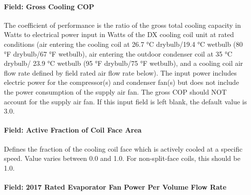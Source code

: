 \paragraph{Field: Gross Cooling COP}

The coefficient of performance is the ratio of the gross total cooling capacity in Watts to electrical power input in Watts of the DX cooling coil unit at rated conditions (air entering the cooling coil at 26.7 °C drybulb/19.4 °C wetbulb (80 °F drybulb/67 °F wetbulb), air entering the outdoor condenser coil at 35 °C drybulb/ 23.9 °C wetbulb (95 °F drybulb/75 °F wetbulb), and a cooling coil air flow rate defined by field rated air flow rate below). The input power includes electric power for the compressor(s) and condenser fan(s) but does not include the power consumption of the supply air fan. The gross COP should NOT account for the supply air fan. If this input field is left blank, the default value is 3.0.

\paragraph{Field: Active Fraction of Coil Face Area}\label{field-active-fraction-of-coil-face-area}

Defines the fraction of the cooling coil face which is actively cooled at a specific speed. Value varies between 0.0 and 1.0. For non-split-face coils, this should be 1.0.

\paragraph{Field: 2017 Rated Evaporator Fan Power Per Volume Flow Rate}

